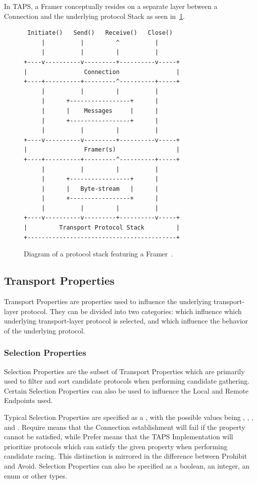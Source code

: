 In TAPS, a Framer conceptually resides on a separate layer between a Connection and the
underlying protocol Stack as seen in~\cref{fig:tpsStack}.

\begin{figure}[htbp]
\centering
\begin{BVerbatim}
 Initiate()   Send()   Receive()   Close()
     |          |         ^          |
     |          |         |          |
+----v----------v---------+----------v-----+
|                Connection                |
+----+----------+---------^----------+-----+
     |          |         |          |
     |      +-----------------+      |
     |      |    Messages     |      |
     |      +-----------------+      |
     |          |         |          |
+----v----------v---------+----------v-----+
|                Framer(s)                 |
+----+----------+---------^----------+-----+
     |          |         |          |
     |      +-----------------+      |
     |      |   Byte-stream   |      |
     |      +-----------------+      |
     |          |         |          |
+----v----------v---------+----------v-----+
|         Transport Protocol Stack         |
+------------------------------------------+
  \end{BVerbatim}
  \caption[Protocol stack with Framer]{Diagram of a protocol stack featuring a Framer~\cite{rfc9622}.}\label{fig:tpsStack}
\end{figure}

\subsection{Transport Properties}
Transport Properties are properties used to influence the underlying transport-layer protocol.
They can be divided into two categories: 
which influence which underlying transport-layer protocol is selected, and
 which influence the behavior of the underlying
protocol.


\subsubsection{Selection Properties}
Selection Properties are the subset of Transport Properties which are
primarily used to filter and sort candidate protocols
when performing candidate gathering. Certain Selection Properties
can also be used to influence the Local and Remote Endpoints used.

Typical Selection Properties are specified as
a , with the possible values being ,
, ,  and .
Require means that the Connection establishment will fail if the property cannot
be satisfied, while Prefer means that the TAPS Implementation will prioritize
protocols which can satisfy the given property when performing candidate racing.
This distinction is mirrored in the difference between Prohibit and Avoid.
Selection Properties can also be specified as a boolean, an integer, an enum or other types.

